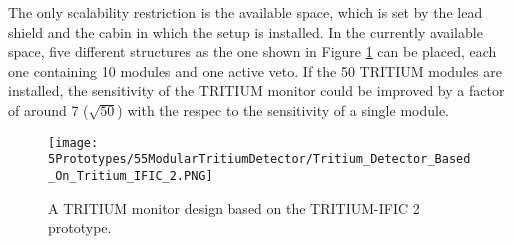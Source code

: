 The only scalability restriction is the available space, which is set by the lead shield and the cabin in which the setup is installed. In the currently available space, five different structures as the one shown in Figure \ref{fig:TritiumMonitorIFIC2Design} can be placed, each one containing 10 modules and one active veto. If the 50 TRITIUM modules are installed, the sensitivity of the TRITIUM monitor could be improved by a factor of around 7 ($\sqrt{50}$) with the respec to the sensitivity of a single module.

\begin{figure}[h]
\centering
\texttt{[image: 5Prototypes/55ModularTritiumDetector/Tritium\_Detector\_Based\_On\_Tritium\_IFIC\_2.PNG]}
\caption{A TRITIUM monitor design based on the TRITIUM-IFIC 2 prototype.\label{fig:TritiumMonitorIFIC2Design}}
\end{figure}
